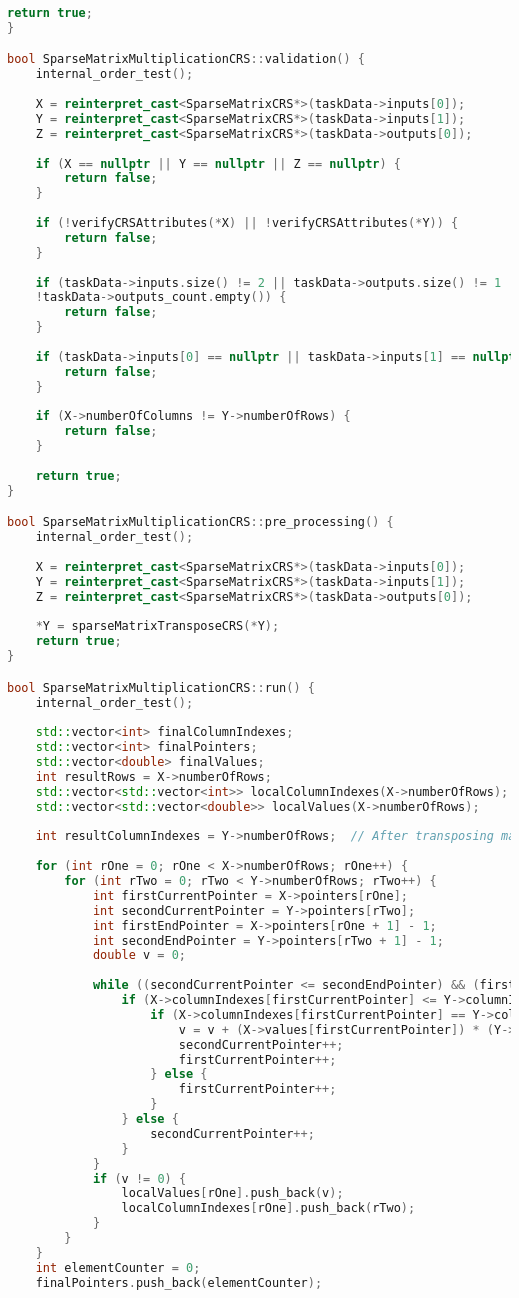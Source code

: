 \documentclass[a4paper, 14pt]{article}
\theoremstyle{plain}
\begin{document}
\begin{lstlisting}[language=C++,caption=Файл sparse\_matmult\_crs.cpp]
	return true;
}

bool SparseMatrixMultiplicationCRS::validation() {
	internal_order_test();
	
	X = reinterpret_cast<SparseMatrixCRS*>(taskData->inputs[0]);
	Y = reinterpret_cast<SparseMatrixCRS*>(taskData->inputs[1]);
	Z = reinterpret_cast<SparseMatrixCRS*>(taskData->outputs[0]);
	
	if (X == nullptr || Y == nullptr || Z == nullptr) {
		return false;
	}
	
	if (!verifyCRSAttributes(*X) || !verifyCRSAttributes(*Y)) {
		return false;
	}
	
	if (taskData->inputs.size() != 2 || taskData->outputs.size() != 1 || !taskData->inputs_count.empty() ||
	!taskData->outputs_count.empty()) {
		return false;
	}
	
	if (taskData->inputs[0] == nullptr || taskData->inputs[1] == nullptr || taskData->outputs[0] == nullptr) {
		return false;
	}
	
	if (X->numberOfColumns != Y->numberOfRows) {
		return false;
	}
	
	return true;
}

bool SparseMatrixMultiplicationCRS::pre_processing() {
	internal_order_test();
	
	X = reinterpret_cast<SparseMatrixCRS*>(taskData->inputs[0]);
	Y = reinterpret_cast<SparseMatrixCRS*>(taskData->inputs[1]);
	Z = reinterpret_cast<SparseMatrixCRS*>(taskData->outputs[0]);
	
	*Y = sparseMatrixTransposeCRS(*Y);
	return true;
}

bool SparseMatrixMultiplicationCRS::run() {
	internal_order_test();
	
	std::vector<int> finalColumnIndexes;
	std::vector<int> finalPointers;
	std::vector<double> finalValues;
	int resultRows = X->numberOfRows;
	std::vector<std::vector<int>> localColumnIndexes(X->numberOfRows);
	std::vector<std::vector<double>> localValues(X->numberOfRows);
	
	int resultColumnIndexes = Y->numberOfRows;  // After transposing matrix Y
	
	for (int rOne = 0; rOne < X->numberOfRows; rOne++) {
		for (int rTwo = 0; rTwo < Y->numberOfRows; rTwo++) {
			int firstCurrentPointer = X->pointers[rOne];
			int secondCurrentPointer = Y->pointers[rTwo];
			int firstEndPointer = X->pointers[rOne + 1] - 1;
			int secondEndPointer = Y->pointers[rTwo + 1] - 1;
			double v = 0;
			
			while ((secondCurrentPointer <= secondEndPointer) && (firstCurrentPointer <= firstEndPointer)) {
				if (X->columnIndexes[firstCurrentPointer] <= Y->columnIndexes[secondCurrentPointer]) {
					if (X->columnIndexes[firstCurrentPointer] == Y->columnIndexes[secondCurrentPointer]) {
						v = v + (X->values[firstCurrentPointer]) * (Y->values[secondCurrentPointer]);
						secondCurrentPointer++;
						firstCurrentPointer++;
					} else {
						firstCurrentPointer++;
					}
				} else {
					secondCurrentPointer++;
				}
			}
			if (v != 0) {
				localValues[rOne].push_back(v);
				localColumnIndexes[rOne].push_back(rTwo);
			}
		}
	}
	int elementCounter = 0;
	finalPointers.push_back(elementCounter);
	

\end{lstlisting}
\end{document}
